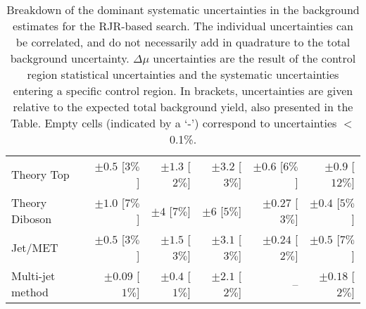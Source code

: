 \begin{table}[H]
\begin{center}
\begin{tabular}{|lrrrrr|}
Theory Top   &  $\pm 0.5$ [$3\%$]  &  $\pm 1.3$ [$2\%$]  &  $\pm 3.2$ [$3\%$]  &  $\pm 0.6$ [$6\%$]  &  $\pm 0.9$ [$12\%$] \\
Theory Diboson  &  $\pm 1.0$ [$7\%$]  &  $\pm 4$ [$7\%$]  &  $\pm 6$ [$5\%$]  &  $\pm 0.27$ [$3\%$]  &  $\pm 0.4$ [$5\%$] \\
Jet/MET   &  $\pm 0.5$ [$3\%$]  &  $\pm 1.5$ [$3\%$]  &  $\pm 3.1$ [$3\%$]  &  $\pm 0.24$ [$2\%$]  &  $\pm 0.5$ [$7\%$] \\
Multi-jet method  &  $\pm 0.09$ [$1\%$]  &  $\pm 0.4$ [$1\%$]  &  $\pm 2.1$ [$2\%$]  &   --    &  $\pm 0.18$ [$2\%$] \\
\hline
\end{tabular}

\end{center}
\caption[Breakdown of uncertainty on background estimates]{
Breakdown of the dominant systematic uncertainties in the background estimates for the RJR-based search.
The individual uncertainties can be correlated, and do not necessarily add in quadrature to
the total background uncertainty. $\Delta\mu$ uncertainties are the result of the control region statistical uncertainties and the systematic uncertainties entering a specific control region. In brackets, uncertainties are given relative to the expected total background yield, also presented in the Table. Empty cells (indicated by a `-') correspond to uncertainties $<$0.1\%. \label{tab:BreakdownSysSRCompressed_RJR}}
\end{table}
